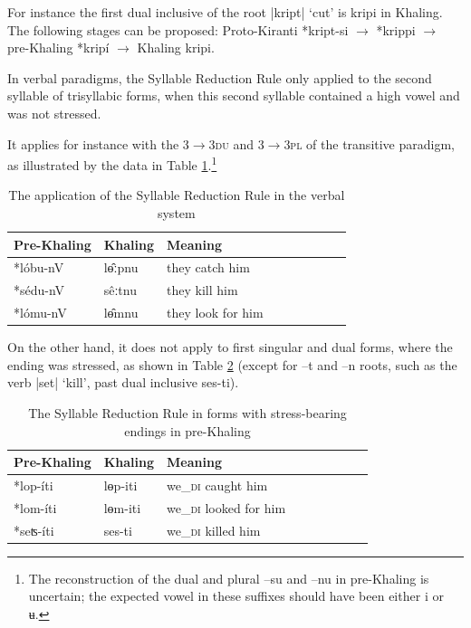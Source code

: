\documentclass[oldfontcommands,oneside,a4paper,11pt]{article}
\newcommand{\ipa}[1]{{\phon \mbox{#1}}} %
\begin{document}
For instance the first dual inclusive of the root |kript| `cut' is \ipa{kripi} in Khaling. The following stages can be proposed: Proto-Kiranti \ipa{*kript-si} $\rightarrow$ \ipa{*krippi} $\rightarrow$ pre-Khaling \ipa{*kripí}  $\rightarrow$ Khaling \ipa{kripi}.


In  verbal paradigms, the Syllable Reduction Rule only applied to the second syllable of trisyllabic forms, when this second syllable contained a high vowel and was not stressed. 

It applies for instance with the \textsc{3$\rightarrow$3du} and \textsc{3$\rightarrow$3pl} of the transitive paradigm, as illustrated by the data in Table \ref{tab:verbal.drr}.\footnote{The reconstruction of the dual and plural \ipa{--su} and \ipa{--nu} in pre-Khaling is uncertain; the expected vowel in these suffixes should have been either \ipa{i} or \ipa{ʉ}. } 

\begin{table}[H] 
\caption{The application of the  Syllable Reduction Rule in the verbal system} \centering  \label{tab:verbal.drr} 
\begin{tabular}{lllllllll} 
\toprule 
Pre-Khaling	&Khaling &Meaning\\
\midrule
\ipa{*lóbu-nV}  & \ipa{lɵ̂ːpnu} & they catch him \\ 
\ipa{*sédu-nV} & \ipa{sêːtnu} & they kill him \\ 
\ipa{*lómu-nV}  & \ipa{lɵ̂mnu} & they look for him \\
\bottomrule
\end{tabular}
\end{table}

On the other hand, it does not apply to first singular and dual forms, where the ending was stressed, as shown in Table \ref{tab:verbal.du} (except for \ipa{--t} and \ipa{--n} roots, such as the verb |set| `kill', past dual inclusive \ipa{ses-ti}).



\begin{table}[H] 
\caption{The  Syllable Reduction Rule in forms with stress-bearing endings in pre-Khaling} \centering  \label{tab:verbal.du} 
\begin{tabular}{lllllllll} 
\toprule 
Pre-Khaling	&Khaling &Meaning\\
\midrule
\ipa{*lop-íti}  & \ipa{lɵp-iti} & we_{\textsc{di}} caught him \\ 
\ipa{*lom-íti}  & \ipa{lɵm-iti} & we_{\textsc{di}} looked for him \\
\midrule
\ipa{*seʦ-íti} & \ipa{ses-ti} & we_{\textsc{di}} killed him \\ 
\bottomrule
\end{tabular}
\end{table}
\end{document}
